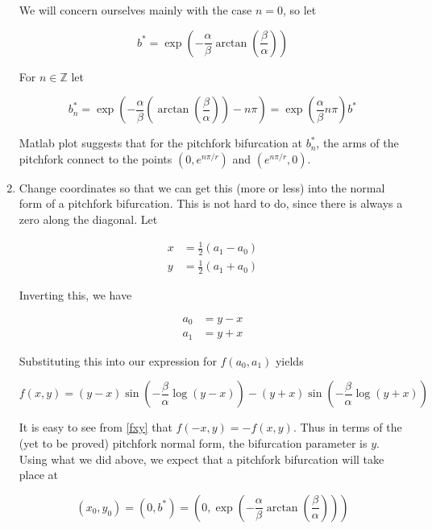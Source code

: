 \documentclass[12pt]{article}
\def\Z{{\mathbb Z}}
\begin{document}
\begin{enumerate}
We will concern ourselves mainly with the case $n = 0$, so let

\begin{equation}
b^* = \exp \left( -\frac{\alpha}{\beta} \arctan \left( \frac{\beta}{\alpha}\right) \right)
\end{equation}

For $n \in \Z$ let 

\begin{equation}
b^*_n = \exp \left( -\frac{\alpha}{\beta} \left( \arctan \left( \frac{\beta}{\alpha}\right) \right) - n \pi \right) 
= \exp\left(\frac{\alpha}{\beta} n \pi \right) b^*
\end{equation}

Matlab plot suggests that for the pitchfork bifurcation at $b^*_n$, the arms of the pitchfork connect to the points $(0, e^{n \pi/r})$ and $(e^{n \pi/r}, 0)$.

\item Change coordinates so that we can get this (more or less) into the normal form of a pitchfork bifurcation. This is not hard to do, since there is always a zero along the diagonal. Let

\begin{align*}
x &= \frac{1}{2}(a_1 - a_0) \\
y &= \frac{1}{2}(a_1 + a_0)
\end{align*}

Inverting this, we have

\begin{align*}
a_0 &= y - x \\
a_1 &= y + x
\end{align*}

Substituting this into our expression for $f(a_0, a_1)$ yields

\begin{equation}\label{fxy}
f(x, y) = 
(y - x) \sin \left( - \frac{\beta}{\alpha} \log(y - x) \right) - (y + x) \sin \left( - \frac{\beta}{\alpha} \log (y + x) \right)
\end{equation}

It is easy to see from \eqref{fxy} that $f(-x, y) = -f(x, y)$. Thus in terms of the (yet to be proved) pitchfork normal form, the bifurcation parameter is $y$.\\

Using what we did above, we expect that a pitchfork bifurcation will take place at

\begin{equation}\label{pitchpt}
(x_0, y_0) = \left(0, b^* \right) = \left( 0, \exp \left( -\frac{\alpha}{\beta} \arctan \left( \frac{\beta}{\alpha}\right) \right) \right)
\end{equation}


\end{enumerate}
\end{document}
